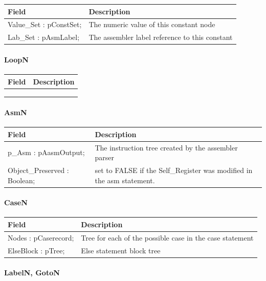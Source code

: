 \documentclass [a4paper,12pt]{article}
\begin{document}
\begin{longtable}{|l|p{10cm}|}
\hline
Field   & Description \\
\hline
\endhead
\hline
\endfoot
\textsf{Value{\_}Set : pConstSet;}& The numeric value of this constant node \\
\textsf{Lab{\_}Set : pAsmLabel;}  & The assembler label reference to this constant
\label{tab27}
\end{longtable}

\paragraph{LoopN}\mbox{}

\begin{longtable}{|l|p{10cm}|}
\hline
Field   & Description \\
\hline
\endhead
\hline
\endfoot
  &  \\
  &  \\
  & 
\end{longtable}

\paragraph{AsmN}\mbox{}

\begin{longtable}{|l|p{10cm}|}
\hline
Field   & Description \\
\hline
\endhead
\hline
\endfoot
\textsf{p{\_}Asm : pAasmOutput;}&
The instruction tree created by the assembler parser \\
\textsf{Object{\_}Preserved : Boolean;}&
set to FALSE if the Self{\_}Register was modified in the asm statement. 
\label{tab29}
\end{longtable}

\paragraph{CaseN}\mbox{}

\begin{longtable}{|l|p{10cm}|}
\hline
Field   & Description \\
\hline
\endhead
\hline
\endfoot
\textsf{Nodes : pCaserecord;}&
    Tree for each of the possible case in the case statement \\
\textsf{ElseBlock : pTree;}&
    Else statement block tree
\label{tab30}
\end{longtable}

\paragraph{LabelN, GotoN}\mbox{}
\end{document}
